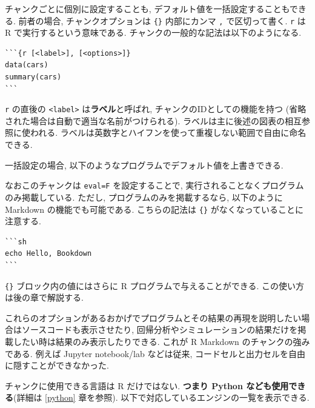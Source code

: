 \documentclass[
  xelatex,ja=standard,jafont=noto]{bxjsbook}
\newenvironment{Shaded}{\begin{snugshade}}{\end{snugshade}}
\newcommand{\AttributeTok}[1]{\textcolor[rgb]{0.77,0.63,0.00}{#1}}
\newcommand{\FunctionTok}[1]{\textcolor[rgb]{0.00,0.00,0.00}{#1}}
\newcommand{\NormalTok}[1]{#1}
\newcommand{\SpecialCharTok}[1]{\textcolor[rgb]{0.00,0.00,0.00}{#1}}
\theoremstyle{definition}
\theoremstyle{definition}
\theoremstyle{definition}
\theoremstyle{definition}
\theoremstyle{remark}
\begin{document}
チャンクごとに個別に設定することも,
デフォルト値を一括設定することもできる. 前者の場合, チャンクオプションは
\texttt{\{\}} 内部にカンマ \texttt{,} で区切って書く. \texttt{r} は R
で実行するという意味である. チャンクの一般的な記法は以下のようになる.

\begin{verbatim}
```{r [<label>], [<options>]}
data(cars)
summary(cars)
```
\end{verbatim}

\texttt{r} の直後の \texttt{\textless{}label\textgreater{}}
は\textbf{ラベル}と呼ばれ, チャンクのIDとしての機能を持つ
(省略された場合は自動で適当な名前がつけられる).
ラベルは主に後述の図表の相互参照に使われる.
ラベルは英数字とハイフンを使って重複しない範囲で自由に命名できる.

一括設定の場合, 以下のようなプログラムでデフォルト値を上書きできる.

\begin{Shaded}
\end{Shaded}

なおこのチャンクは \texttt{eval=F} を設定することで,
実行されることなくプログラムのみ掲載している. ただし,
プログラムのみを掲載するなら, 以下のように Markdown
の機能でも可能である. こちらの記法は \texttt{\{\}}
がなくなっていることに注意する.

\begin{verbatim}
```sh
echo Hello, Bookdown
```
\end{verbatim}

\texttt{\{\}} ブロック内の値にはさらに R プログラムで与えることができる.
この使い方は後の章で解説する.

これらのオプションがあるおかげでプログラムとその結果の再現を説明したい場合はソースコードも表示させたり,
回帰分析やシミュレーションの結果だけを掲載したい時は結果のみ表示したりできる.
これが R Markdown のチャンクの強みである. 例えば Jupyter notebook/lab
などは従来, コードセルと出力セルを自由に隠すことができなかった.

チャンクに使用できる言語は R だけではない. \textbf{つまり Python
なども使用できる}(詳細は \ref{python} 章を参照).
以下で対応しているエンジンの一覧を表示できる.
\end{document}
